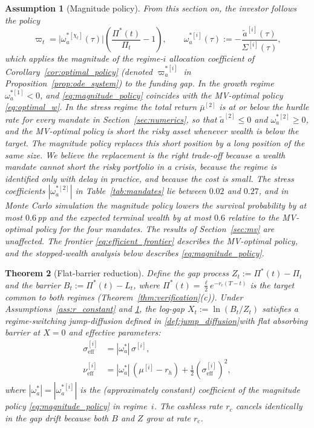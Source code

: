 \documentclass[11pt,a4paper]{article}
\numberwithin{equation}{section}
\newtheorem{theorem}{Theorem}[section]
\newtheorem{assumption}[theorem]{Assumption}
\begin{document}
\begin{assumption}[Magnitude policy]\label{ass:magnitude_policy}
From this section on, the investor follows the policy
\begin{equation}\label{eq:magnitude_policy}
\varpi_t = \big|\omega^{*[\chi_t]}_a(\tau)\big| \left(\frac{\Pi^{*}(t)}{\Pi_t} - 1\right), \qquad \omega^{*[i]}_a(\tau) := -\frac{\tilde{a}^{[i]}(\tau)}{\Sigma^{[i]}(\tau)},
\end{equation}
which applies the magnitude of the regime-$i$ allocation coefficient of Corollary~\ref{cor:optimal_policy} (denoted $\varpi^{*[i]}_a$ in Proposition~\ref{prop:ode_system}) to the funding gap. In the growth regime $\omega^{*[1]}_a < 0$, and \eqref{eq:magnitude_policy} coincides with the MV-optimal policy \eqref{eq:optimal_w}. In the stress regime the total return $\bar{\mu}^{[2]}$ is at or below the hurdle rate for every mandate in Section~\ref{sec:numerics}, so that $\tilde{a}^{[2]} \leq 0$ and $\omega^{*[2]}_a \geq 0$, and the MV-optimal policy is short the risky asset whenever wealth is below the target. The magnitude policy replaces this short position by a long position of the same size. We believe the replacement is the right trade-off because a wealth mandate cannot short the risky portfolio in a crisis, because the regime is identified only with delay in practice, and because the cost is small. The stress coefficients $|\omega^{*[2]}_a|$ in Table~\ref{tab:mandates} lie between $0.02$ and $0.27$, and in Monte Carlo simulation the magnitude policy lowers the survival probability by at most $0.6$\,pp and the expected terminal wealth by at most $0.6$ relative to the MV-optimal policy for the four mandates. The results of Section~\ref{sec:mv} are unaffected. The frontier \eqref{eq:efficient_frontier} describes the MV-optimal policy, and the stopped-wealth analysis below describes \eqref{eq:magnitude_policy}.
\end{assumption}


\begin{theorem}[Flat-barrier reduction]\label{thm:flat_barrier}
Define the gap process $Z_t := \Pi^{*}(t) - \Pi_t$ and the barrier $B_t := \Pi^{*}(t) - L_t$, where $\Pi^{*}(t) = \tfrac{\ell}{2}e^{-r_c(T-t)}$ is the target common to both regimes (Theorem~\ref{thm:verification}(c)). Under Assumptions~\ref{ass:r_constant} and \ref{ass:magnitude_policy}, the log-gap $X_t := \ln(B_t / Z_t)$ satisfies a regime-switching jump-diffusion defined in \ref{def:jump_diffusion}with flat absorbing barrier at $X = 0$ and effective parameters:
\begin{align}
\sigma^{[i]}_{\mathrm{eff}} &= |\omega^*_a|\, \sigma^{[i]}, \label{eq:sigma_eff}\\
\nu^{[i]}_{\mathrm{eff}} &= |\omega^*_a|\,(\mu^{[i]} - r_h) + \tfrac{1}{2}(\sigma^{[i]}_{\mathrm{eff}})^2, \label{eq:nu_eff}
\end{align}
where $|\omega^*_a| = |\omega^{*[i]}_a|$ is the (approximately constant) coefficient of the magnitude policy \eqref{eq:magnitude_policy} in regime~$i$.  The cashless rate $r_c$ cancels identically in the gap drift because both $B$ and $Z$ grow at rate $r_c$.
\end{theorem}
\end{document}
